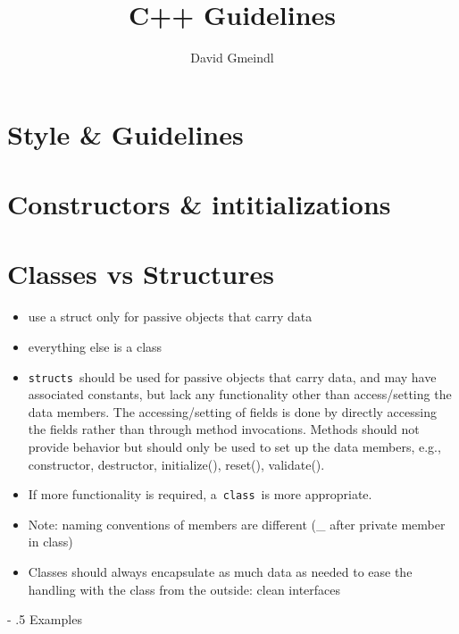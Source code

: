 \documentclass[
10pt,
a4paper,
parskip=half,	%
DIV=0,			%
BCOR=10mm
]{scrartcl}
\author{David Gmeindl}
\title{C++ Guidelines}
\makeatletter
\renewcommand\paragraph{%
	\@startsection{paragraph}{4}{0mm}%
	{-\baselineskip}%
	{.5\baselineskip}%
	{\normalfont\normalsize\bfseries}}
\newcommand{\ttt}[1]{\texttt{#1}}
\makeatother
\begin{document}
	
	
	\pagestyle{empty}
	\maketitle
	\tableofcontents
	\thispagestyle{empty}
	
	\newpage
	\pagebreak
	
	\pagestyle{scrheadings}
	
\section{Style \& Guidelines}

	
\section{Constructors \& intitializations}
	


\section{Classes vs Structures}

\begin{itemize}
	\item use a struct only for passive objects that carry data
	\item everything else is a class
	\item \ttt{structs} should be used for passive objects that carry data, and may have associated constants, but lack any functionality other than access/setting the data members. The accessing/setting of fields is done by directly accessing the fields rather than through method invocations. Methods should not provide behavior but should only be used to set up the data members, e.g., constructor, destructor, initialize(), reset(), validate().
	\item If more functionality is required, a \ttt{class} is more appropriate.
	\item Note: naming conventions of members are different (\_ after private member in class)
	\item Classes should always encapsulate as much data as needed to ease the handling with the class from the outside: clean interfaces
\end{itemize}

\newpage
\paragraph{Examples}
\end{document}
